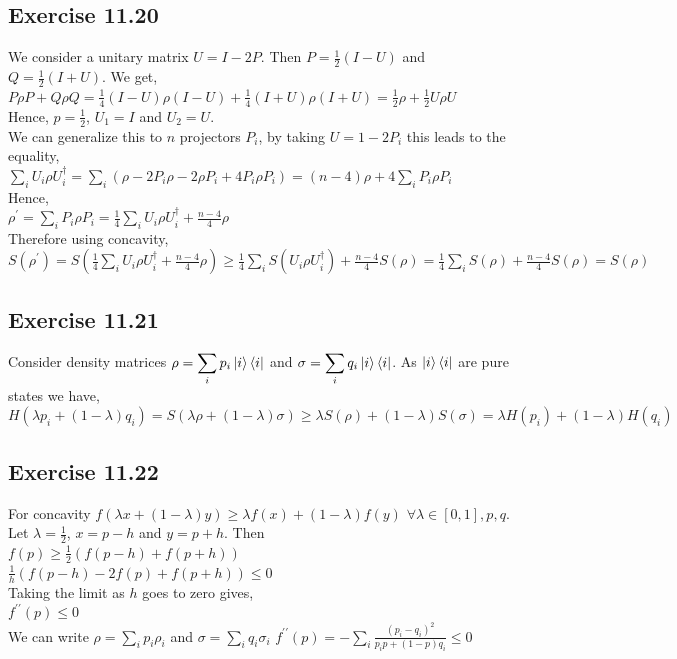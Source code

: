 \documentclass[a4paper,12pt]{article}
\begin{document}
\subsection*{Exercise 11.20}
We consider a unitary matrix $U=I-2P$. Then $P=\frac{1}{2}(I-U)$ and $Q=\frac{1}{2}(I+U)$. We get,\\
$P\rho P+Q\rho Q=\frac{1}{4}(I-U)\rho(I-U)+\frac{1}{4}(I+U)\rho(I+U)=
\frac{1}{2}\rho+\frac{1}{2}U\rho U$\\
Hence, $p=\frac{1}{2}$, $U_1=I$ and $U_2=U$.\\
We can generalize this to $n$ projectors $P_i$, by taking $U=1-2P_i$ this leads to the equality,\\
$\displaystyle\sum_iU_i\rho U_i^\dagger =\sum_i(\rho-2P_i\rho-2\rho P_i+4P_i\rho P_i)=
(n-4)\rho+4\sum_iP_i\rho P_i$\\
Hence,\\
$\rho^\prime=\displaystyle\sum_iP_i\rho P_i=\frac{1}{4}\sum_iU_i\rho U_i^\dagger +\frac{n-4}{4}\rho$\\
Therefore using concavity,\\
$S\displaystyle(\rho^\prime)=S\left(\frac{1}{4}\sum_iU_i\rho U_i^\dagger +\frac{n-4}{4}\rho\right)\geq
\frac{1}{4}\sum_iS(U_i\rho U_i^\dagger)+\frac{n-4}{4}S(\rho)=
\frac{1}{4}\sum_iS(\rho)+\frac{n-4}{4}S(\rho)=S(\rho)$
\subsection*{Exercise 11.21}
Consider density matrices $\rho=\displaystyle\sum_ip_i\ket{i}\bra{i}$ and
$\sigma=\displaystyle\sum_iq_i\ket{i}\bra{i}$. As $\ket{i}\bra{i}$ are pure states we have,\\
$H(\lambda p_i+(1-\lambda)q_i)=S(\lambda\rho+(1-\lambda)\sigma)\geq 
\lambda S(\rho)+(1-\lambda)S(\sigma)=\lambda H(p_i)+(1-\lambda)H(q_i)$
\subsection*{Exercise 11.22}
For concavity $f(\lambda x+(1-\lambda)y)\geq \lambda f(x)+(1-\lambda)f(y)$ $\forall \lambda\in[0,1],p,q$.\\
Let $\lambda=\frac{1}{2}$, $x=p-h$ and $y=p+h$. Then\\ 
$f(p)\geq \frac{1}{2}(f(p-h)+f(p+h))$\\
$\frac{1}{h}(f(p-h)-2f(p)+f(p+h))\leq 0$\\
Taking the limit as $h$ goes to zero gives,\\
$f^{\prime\prime}(p)\leq 0$\\
We can write $\rho=\displaystyle\sum_ip_i\rho_i$ and
$\sigma=\displaystyle\sum_iq_i\sigma_i$
$f^{\prime\prime}(p)=\displaystyle -\sum_i\frac{(p_i-q_i)^2}{p_ip+(1-p)q_i}\leq 0$
\end{document}
